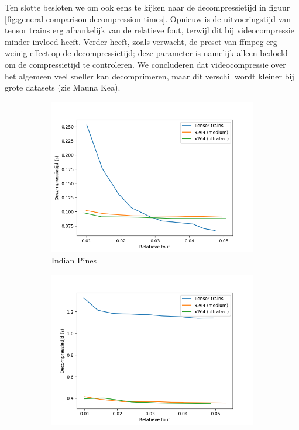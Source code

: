 Ten slotte besloten we om ook eens te kijken naar de decompressietijd in figuur \ref{fig:general-comparison-decompression-times}. Opnieuw is de uitvoeringstijd van tensor trains erg afhankelijk van de relatieve fout, terwijl dit bij videocompressie minder invloed heeft. Verder heeft, zoals verwacht, de preset van ffmpeg erg weinig effect op de decompressietijd; deze parameter is namelijk alleen bedoeld om de compressietijd te controleren. We concluderen dat videocompressie over het algemeen veel sneller kan decomprimeren, maar dit verschil wordt kleiner bij grote datasets (zie Mauna Kea).

\newpage
\begin{figure}[H]
\centering
\begin{subfigure}{0.48\textwidth}
  \centering
  \includegraphics[width=\linewidth]{images/general_comparison_decompression_times_Indian_Pines.png}
  \caption{Indian Pines}
\end{subfigure}
\begin{subfigure}{0.48\textwidth}
  \centering
  \includegraphics[width=\linewidth]{images/general_comparison_decompression_times_Cuprite.png}

\end{subfigure}
\end{figure}
